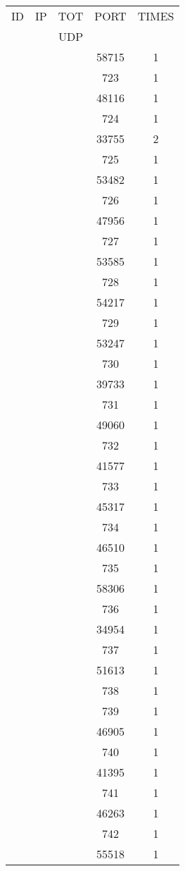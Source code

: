 \documentclass[a4paper]{scrartcl}
\begin{document}
\begin{minipage}[b]{0.5\linewidth}
\begin{tabular}{| c | c | c | c | c |}
\hline
ID & IP & TOT & PORT & TIMES \\ 
   &    & UDP &      &       \\ 
\hline
& & & 58715 & 1 \\ & & & 723 & 1 \\ & & & 48116 & 1 \\ & & & 724 & 1 \\ & & & 33755 & 2 \\ & & & 725 & 1 \\ & & & 53482 & 1 \\ & & & 726 & 1 \\ & & & 47956 & 1 \\ & & & 727 & 1 \\ & & & 53585 & 1 \\ & & & 728 & 1 \\ & & & 54217 & 1 \\ & & & 729 & 1 \\ & & & 53247 & 1 \\ & & & 730 & 1 \\ & & & 39733 & 1 \\ & & & 731 & 1 \\ & & & 49060 & 1 \\ & & & 732 & 1 \\ & & & 41577 & 1 \\ & & & 733 & 1 \\ & & & 45317 & 1 \\ & & & 734 & 1 \\ & & & 46510 & 1 \\ & & & 735 & 1 \\ & & & 58306 & 1 \\ & & & 736 & 1 \\ & & & 34954 & 1 \\ & & & 737 & 1 \\ & & & 51613 & 1 \\ & & & 738 & 1 \\ & & & 739 & 1 \\ & & & 46905 & 1 \\ & & & 740 & 1 \\ & & & 41395 & 1 \\ & & & 741 & 1 \\ & & & 46263 & 1 \\ & & & 742 & 1 \\ & & & 55518 & 1 \\ \hline\end{tabular}\end{minipage} \hfill\begin{minipage}[b]{0.5\linewidth}\begin{tabular}{| c | c | c | c | c |}

\end{tabular}
\end{minipage}
\end{document}
